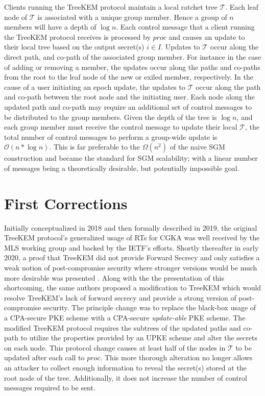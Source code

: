 \documentclass[12pt,twocolumn]{article}
\begin{document}
	Clients running the TreeKEM protocol maintain a local ratchet tree $\mathcal{T}$.
	Each leaf node of $\mathcal{T}$ is associated with a unique group member.
	Hence a group of $n$ members will have a depth of $\log n$.
	Each control message that a client running the TreeKEM protocol receives is processed by $proc$ and causes an update to their local tree based on the output secret(s) $i \in I$.
	Updates to $\mathcal{T}$ occur along the direct path, and co-path of the associated group member.
	For instance in the case of adding or removing a member, the updates occur along the paths and co-paths from the root to the leaf node of the new or exiled member, respectively.
	In the cause of a user initiating an epoch update, the updates to $\mathcal{T}$ occur along the path and co-path between the root node and the initiating user.
	Each node along the updated path and co-path may require an additional set of control messages to be distributed to the group members.
	Given the depth of the tree is $\log n$, and each group member must receive the control message to update their local $\mathcal{T}$, the total number of control messages to perform a group-wide update is $\mathcal{O}\left( n * \log n \right)$.
	This is far preferable to the $\Omega\left( n ^ 2 \right)$ of the naive SGM construction and became the standard for SGM scalability; with a linear number of messages being a theoretically desirable, but potentially impossible goal.


	\section*{First Corrections}
	
	Initially conceptualized in 2018 and then formally described in 2019, the original TreeKEM protocol's generalized usage of RTs for CGKA was well received by the MLS working group and backed by the IETF's efforts.
	Shortly thereafter in early 2020, a proof that TreeKEM did not provide Forward Secrecy and only satisfies a weak notion of post-compromise security where stronger versions would be much more desirable was presented \cite{alwen2020security}.
	Along with the the presentation of this shortcoming, the same authors proposed a modification to TreeKEM which would resolve TreeKEM's lack of forward secrecy and provide a strong version of post-compromise security.
	The principle change was to replace the black-box usage of a CPA-secure PKE scheme with a CPA-secure \emph{update-able} PKE scheme.
	The modified TreeKEM protocol requires the subtrees of the updated paths and co-path to
	utilize the properties provided by an UPKE scheme and alter the secrets on each node.
	This protocol change causes at least half of the nodes in $\mathcal{T}$ to be updated after each call to $proc$.
	This more thorough alteration no longer allows an attacker to collect enough information to reveal the secret(s) stored at the root node of the tree.
	Additionally, it does not increase the number of control messages required to be sent.
\end{document}
